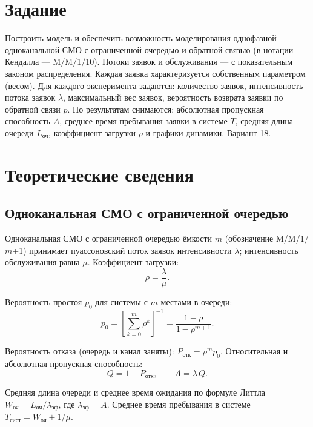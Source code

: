 \documentclass[a4paper,14pt,oneside,openany]{memoir}
\begin{document}
\section*{Задание}
Построить модель и обеспечить возможность моделирования однофазной одноканальной СМО с ограниченной очередью и обратной связью (в нотации Кендалла --- M/M/1/10). Потоки заявок и обслуживания --- с показательным законом распределения. Каждая заявка характеризуется собственным параметром (весом). Для каждого эксперимента задаются: количество заявок, интенсивность потока заявок $\lambda$, максимальный вес заявок, вероятность возврата заявки по обратной связи $p$. По результатам снимаются: абсолютная пропускная способность $A$, среднее время пребывания заявки в системе $T$, средняя длина очереди $L_\text{оч}$, коэффициент загрузки $\rho$ и графики динамики. Вариант 18.

\section{Теоретические сведения}

\subsection{Одноканальная СМО с ограниченной очередью}

Одноканальная СМО с ограниченной очередью ёмкости $m$ (обозначение M/M/1/$m$+1) принимает пуассоновский поток заявок интенсивности $\lambda$; интенсивность обслуживания равна $\mu$. Коэффициент загрузки:
\begin{equation}
    \rho = \frac{\lambda}{\mu}.
\end{equation}

Вероятность простоя $p_0$ для системы с $m$ местами в очереди:
\begin{equation}
    p_0 = \left[\sum_{k=0}^{m} \rho^{k}\right]^{-1} = \frac{1-\rho}{1-\rho^{m+1}}.
\end{equation}

Вероятность отказа (очередь и канал заняты): $P_\text{отк}=\rho^{m}p_0$. Относительная и абсолютная пропускная способность:
\begin{equation}
    Q = 1 - P_\text{отк}, \qquad A = \lambda\,Q.
\end{equation}

Средняя длина очереди и среднее время ожидания по формуле Литтла $W_\text{оч}=L_\text{оч}/\lambda_\text{эф}$, где $\lambda_\text{эф}=A$. Среднее время пребывания в системе $T_\text{сист}=W_\text{оч}+1/\mu$.
\end{document}

